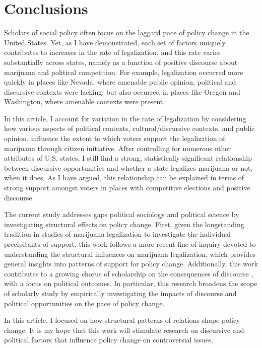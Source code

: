 \section{Conclusions}

Scholars of social policy often focus on the laggard pace of policy change in the United States.  Yet, as I have demonstrated, each set of factors uniquely contributes to increases in the rate of legalization, and this rate varies substantially across states, namely as a function of positive discourse about marijuana and political competition. For example, legalization occurred more quickly in places like Nevada, where amenable public opinion, political and discursive contexts were lacking, but also occurred in places like Oregon and Washington, where amenable contexts were present. %

In this article, I account for variation in the rate of legalization by considering how various aspects of political contexts, cultural/discursive contexts, and public opinion, influence the extent to which voters support the legalization of marijuana through citizen initiative. After controlling for numerous other attributes of U.S. states, I still find a strong, statistically significant relationship between discursive opportunities and whether a state legalizes marijuana or not, when it does. As I have argued, this relationship can be explained in terms of strong support amongst voters in places with competitive elections and positive discourse

The current study addresses gaps political sociology and political science by investigating  structural effects on policy change. First, given the longstanding tradition in studies of marijuana legalization to investigate the individual precipitants of support, this work follows a more recent line of inquiry devoted to understanding the structural influences on marijuana legalization, which provides general insights into patterns of support for policy change. Additionally, this work contributes to a growing chorus of scholarship on the consequences of discourse \citep{bail_2012,vasi_et_al_2015}, with a focus on political outcomes. In particular, this research broadens the scope of scholarly study by empirically investigating the impacts of discourse and political opportunities on the pace of policy change. 

In this article, I focused on how structural patterns of relations shape policy change. It is my hope that this work will stimulate research on discursive and political factors that influence policy change on controversial issues.

